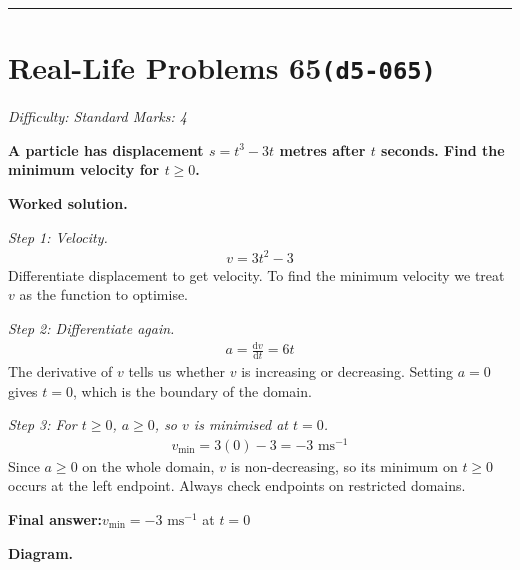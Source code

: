 \documentclass[11pt]{article}
\newcommand{\question}[1]{\par\medskip\noindent\textbf{#1}\par}
\begin{document}
\medskip\hrule

\section*{Real-Life Problems 65\quad\small\texttt{(d5-065)}}
\textit{Difficulty: Standard \quad\textbar\quad Marks: 4}

\question{A particle has displacement \( s = t^3 - 3t \) metres after \( t \) seconds. Find the minimum velocity for \( t \ge 0 \).}

\textbf{Worked solution.}

\textit{Step 1: Velocity.}
\[\begin{gathered}
v = 3t^2 - 3
\end{gathered}\]
Differentiate displacement to get velocity. To find the minimum velocity we treat \( v \) as the function to optimise.

\textit{Step 2: Differentiate again.}
\[\begin{gathered}
a = \frac{\mathrm{d}v}{\mathrm{d}t} = 6t
\end{gathered}\]
The derivative of \( v \) tells us whether \( v \) is increasing or decreasing. Setting \( a = 0 \) gives \( t = 0 \), which is the boundary of the domain.

\textit{Step 3: For \( t \ge 0 \), \( a \ge 0 \), so \( v \) is minimised at \( t = 0 \).}
\[\begin{gathered}
v_{\min} = 3(0) - 3 = -3 \text{ ms}^{-1}
\end{gathered}\]
Since \( a \ge 0 \) on the whole domain, \( v \) is non-decreasing, so its minimum on \( t \ge 0 \) occurs at the left endpoint. Always check endpoints on restricted domains.

\begin{answerbox}
\textbf{Final answer:}\quad \(\displaystyle  v_{\min} = -3 \text{ ms}^{-1} \) at \(\displaystyle  t = 0 \)
\end{answerbox}
\textbf{Diagram.}
\end{document}
